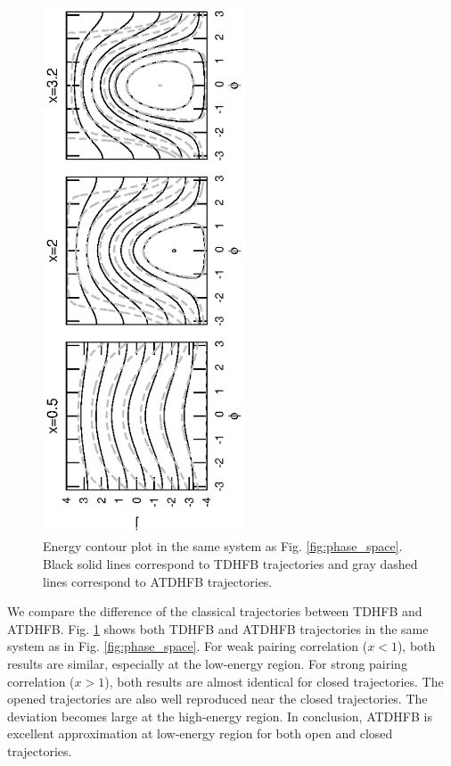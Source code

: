 \documentclass[11pt]{book} %
\begin{document}
\begin{figure}[tb]
 \begin{center}
  \includegraphics[width=60mm,angle=-90]{images/phase_compare.eps}
 \end{center}
 \caption{Energy contour plot in the same system as Fig. \ref{fig:phase_space}. Black solid lines correspond to TDHFB trajectories and gray dashed lines correspond to ATDHFB trajectories. 
	}
 \label{fig:phase_compare}
\end{figure}

We compare the difference of the classical trajectories between TDHFB and ATDHFB. Fig. \ref{fig:phase_compare} shows both TDHFB and ATDHFB trajectories in the same system as in Fig. \ref{fig:phase_space}. For weak pairing correlation ($x<1$), both results are similar, especially at the low-energy region. For strong pairing correlation ($x>1$), both results are almost identical for closed trajectories. The opened trajectories are also well reproduced near the closed trajectories. The deviation becomes large at the high-energy region. In conclusion, ATDHFB is excellent approximation at low-energy region for both open and closed trajectories.
\end{document}
